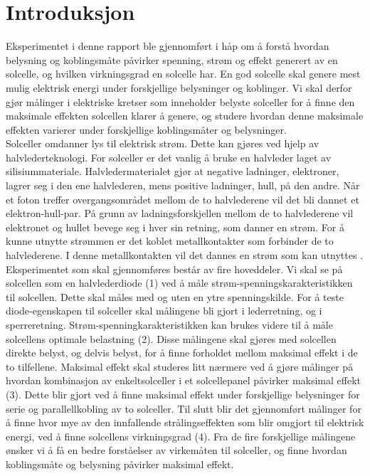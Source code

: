 \documentclass[%
 reprint,
 amsmath,amssymb,
 aps,
 norsk,
 booktabs
]{revtex4-1}
\begin{document}
\section{Introduksjon}
Eksperimentet i denne rapport ble gjennomført i håp om å forstå hvordan belysning og koblingsmåte påvirker spenning, strøm og effekt generert av en solcelle, og hvilken virkningsgrad en solcelle har. En god solcelle skal genere mest mulig elektrisk energi under forskjellige belysninger og koblinger. Vi skal derfor gjør målinger i elektriske kretser som inneholder belyste solceller for å finne den maksimale effekten solcellen klarer å genere, og studere hvordan denne maksimale effekten varierer under forskjellige koblingsmåter og belysninger.\\
Solceller omdanner lys til elektrisk strøm. Dette kan gjøres ved hjelp av halvlederteknologi. For solceller er det vanlig å bruke en halvleder laget av silisiummateriale. Halvledermaterialet gjør at negative ladninger, elektroner, lagrer seg i den ene halvlederen, mens positive ladninger, hull, på den andre. Når et foton treffer overgangsområdet mellom de to halvlederene vil det bli dannet et elektron-hull-par. På grunn av ladningsforskjellen mellom de to halvlederene vil elektronet og hullet bevege seg i hver sin retning, som danner en strøm. For å kunne utnytte strømmen er det koblet metallkontakter som forbinder de to halvlederene. I denne metallkontakten vil det dannes en strøm som kan utnyttes \cite{snl}.\\
Eksperimentet som skal gjennomføres består av fire hoveddeler. Vi skal se på solcellen som en halvlederdiode (1) ved å måle strøm-spenningskarakteristikken til solcellen. Dette skal måles med og uten en ytre spenningskilde. For å teste diode-egenskapen til solceller skal målingene bli gjort i lederretning, og i sperreretning. Strøm-spenningkarakteristikken kan brukes videre til å måle solcellens optimale belastning (2). Disse målingene skal gjøres med solcellen direkte belyst, og delvis belyst, for å finne forholdet mellom maksimal effekt i de to tilfellene. Maksimal effekt skal studeres litt nærmere ved å gjøre målinger på hvordan kombinasjon av enkeltsolceller i et solcellepanel påvirker maksimal effekt (3). Dette blir gjort ved å finne maksimal effekt under forskjellige belysninger for serie og parallellkobling av to solceller. Til slutt blir det gjennomført målinger for å finne hvor mye av den innfallende strålingseffekten som blir omgjort til elektrisk energi, ved å finne solcellens virkningsgrad (4). Fra de fire forskjellige målingene ønsker vi å få en bedre forståelser av virkemåten til solceller, og finne hvordan koblingsmåte og belysning påvirker maksimal effekt. \\
\end{document}
